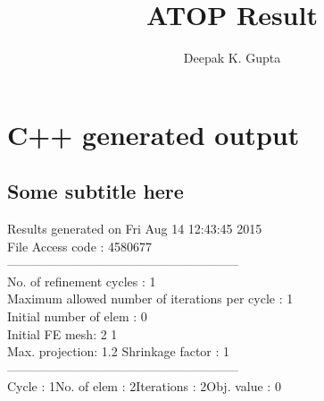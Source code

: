 \documentclass{article}
\title{ATOP Result}
\author{Deepak K. Gupta}
\begin{document}
\maketitle
\section{C++ generated output}
\subsection{Some subtitle here}
{\selectfont
Results generated  on Fri Aug 14 12:43:45 2015
\\File Access code : 4580677\\ 
--------------------------------------------------------\\ 
No. of refinement cycles : 1\\
Maximum allowed number of iterations per cycle : 1\\
Initial number of elem : 0\\ 
Initial FE mesh: 2 1\\ 
Max. projection: 1.2 Shrinkage factor : 1\\ 
--------------------------------------------------------\\ 
Cycle : 1\qquad No. of elem : 2\qquad Iterations : 2\qquad Obj. value : 0\qquad 
}
\begin{figure}[H] 
\centering 
\begin{subfigure}{.45\linewidth} \centering 
{}  
\end{subfigure}  
\hfill  
\begin{subfigure}{.45\linewidth} \centering 
{}  
\end{subfigure}  
\end{figure}  
\end{document}
